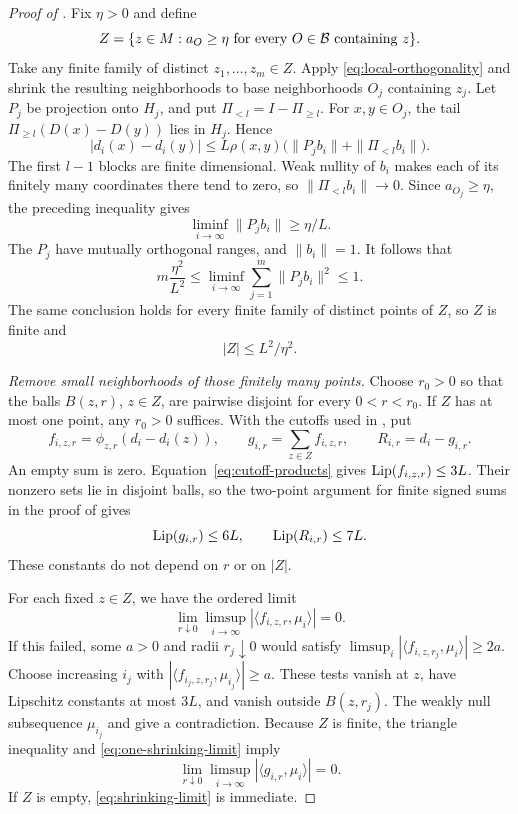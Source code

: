 \begin{proof}[Proof of ]
Fix \(\eta>0\) and define
\[
 Z=\{z\in M:a_O\ge\eta\ \hbox{for every }O\in\mathcal B
                         \hbox{ containing }z\}.
\]
Take any finite family of distinct \(z_1,\ldots,z_m\in Z\).
Apply \eqref{eq:local-orthogonality} and shrink the resulting
neighborhoods to base neighborhoods \(O_j\) containing \(z_j\).
Let \(P_j\) be projection onto \(H_j\), and put
\(\Pi_{<l}=I-\Pi_{\ge l}\). For \(x,y\in O_j\), the tail
\(\Pi_{\ge l}(D(x)-D(y))\) lies in \(H_j\). Hence
\[
 |d_i(x)-d_i(y)|
 \le L\rho(x,y)\bigl(\|P_jb_i\|+\|\Pi_{<l}b_i\|\bigr).
\]
The first \(l-1\) blocks are finite dimensional. Weak nullity of
\(b_i\) makes each of its finitely many coordinates there tend to
zero, so \(\|\Pi_{<l}b_i\|\to0\). Since \(a_{O_j}\ge\eta\),
the preceding inequality gives
\[
 \liminf_{i\to\infty}\|P_jb_i\|\ge\eta/L.
\]
The \(P_j\) have mutually orthogonal ranges, and \(\|b_i\|=1\).
It follows that
\[
 m\frac{\eta^2}{L^2}
 \le \liminf_{i\to\infty}\sum_{j=1}^m\|P_jb_i\|^2
 \le1.
\]
The same conclusion holds for every finite family of distinct points
of \(Z\), so \(Z\) is finite and
\begin{equation}
\label{eq:exceptional-cardinality}
 |Z|\le L^2/\eta^2.
\end{equation}

\medskip
\noindent\emph{Remove small neighborhoods of those finitely many
points.}
Choose \(r_0>0\) so that the balls \(B(z,r)\), \(z\in Z\), are
pairwise disjoint for every \(0<r<r_0\). If \(Z\) has at most one
point, any \(r_0>0\) suffices. With the cutoffs used in
, put
\[
 f_{i,z,r}=\phi_{z,r}(d_i-d_i(z)),\qquad
 g_{i,r}=\sum_{z\in Z}f_{i,z,r},\qquad
 R_{i,r}=d_i-g_{i,r}.
\]
An empty sum is zero. Equation~\eqref{eq:cutoff-products} gives
\(\operatorname{Lip}(f_{i,z,r})\le3L\). Their nonzero sets lie in disjoint balls,
so the two-point argument for finite signed sums in the proof of
 gives
\begin{equation}
\label{eq:global-remainder}
 \operatorname{Lip}(g_{i,r})\le6L,\qquad \operatorname{Lip}(R_{i,r})\le7L.
\end{equation}
These constants do not depend on \(r\) or on \(|Z|\).

For each fixed \(z\in Z\), we have the ordered limit
\begin{equation}
\label{eq:one-shrinking-limit}
 \lim_{r\downarrow0}\limsup_{i\to\infty}
      |\langle f_{i,z,r},\mu_i\rangle|=0.
\end{equation}
If this failed, some \(a>0\) and radii \(r_j\downarrow0\) would
satisfy
\(\limsup_i|\langle f_{i,z,r_j},\mu_i\rangle|\ge2a\).
Choose increasing \(i_j\) with
\(|\langle f_{i_j,z,r_j},\mu_{i_j}\rangle|\ge a\).
These tests vanish at \(z\), have Lipschitz constants at most \(3L\),
and vanish outside \(B(z,r_j)\). The weakly null subsequence
\(\mu_{i_j}\) and  give a contradiction.
Because \(Z\) is finite, the triangle inequality and
\eqref{eq:one-shrinking-limit} imply
\begin{equation}
\label{eq:shrinking-limit}
 \lim_{r\downarrow0}\limsup_{i\to\infty}
      |\langle g_{i,r},\mu_i\rangle|=0.
\end{equation}
If \(Z\) is empty, \eqref{eq:shrinking-limit} is immediate.


\end{proof}
